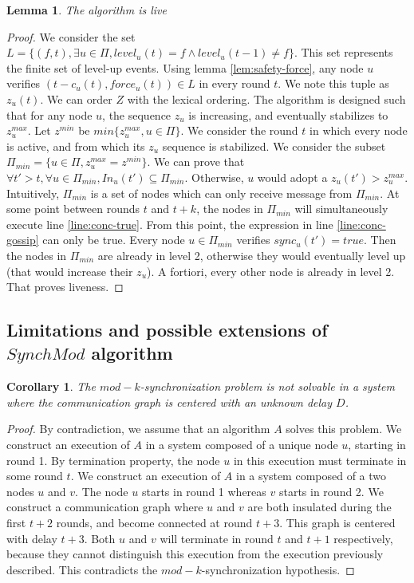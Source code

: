 \documentclass[11pt,letterpaper]{article}
\newtheorem{lem}[thm]{Lemma}
\newtheorem{cor}[thm]{Corollary}
\begin{document}
\begin{lem}
	The algorithm is live
\end{lem}
\begin{proof}
	We consider the set $L = \{(f,t), \exists u \in \Pi, level_u(t) = f \wedge level_u(t-1) \neq f\}$.
	This set represents the finite set of level-up events.
	Using lemma \ref{lem:safety-force}, any node $u$ verifies $(t-c_u(t), force_u(t)) \in L$ in every round $t$.
	We note this tuple as $z_u(t)$.
	We can order $Z$ with the lexical ordering.
	The algorithm is designed such that for any node $u$, the sequence $z_u$ is increasing, and eventually stabilizes to $z_u^{max}$.
	Let $z^{min}$ be $min \{z_u^{max}, u \in \Pi\}$.
	We consider the round $t$ in which every node is active, and from which its $z_u$ sequence is stabilized.
	We consider the subset $\Pi_{min} = \{u \in \Pi, z_u^{max} = z^{min}\}$.
	We can prove that $\forall t' > t, \forall u \in \Pi_{min}, In_u(t') \subseteq \Pi_{min}$.
	Otherwise, $u$ would adopt a $z_u(t') > z_u^{max}$.
	Intuitively, $\Pi_{min}$ is a set of nodes which can only receive message from $\Pi_{min}$.
	At some point between rounds $t$ and $t+k$, the nodes in $\Pi_{min}$ will simultaneously execute line \ref{line:conc-true}.
	From this point, the expression in line \ref{line:conc-gossip} can only be true.
	Every node $u \in \Pi_{min}$ verifies $sync_u(t') = true$.
	Then the nodes in $\Pi_{min}$ are already in level 2, otherwise they would eventually level up (that would increase their $z_u$).
	A fortiori, every other node is already in level 2.
	That proves liveness.
\end{proof}

\subsection{Limitations and possible extensions of $SynchMod$ algorithm}

\begin{cor}
	The $mod-k$-synchronization problem is not solvable in a system where the communication graph is centered with an unknown delay $D$.
\end{cor}
\begin{proof}
	By contradiction, we assume that an algorithm $A$ solves this problem.
	We construct an execution of $A$ in a system composed of a unique node $u$, starting in round 1.
	By termination property, the node $u$ in this execution must terminate in some round $t$.
	We construct an execution of $A$ in a system composed of a two nodes $u$ and $v$. The node $u$ starts in round 1 whereas $v$ starts in round 2.
	We construct a communication graph where $u$ and $v$ are both insulated during the first $t+2$ rounds, and become connected at round $t+3$.
	This graph is centered with delay $t+3$.
	Both $u$ and $v$ will terminate in round $t$ and $t+1$ respectively, because they cannot distinguish this execution from the execution previously described.
	This contradicts the $mod-k$-synchronization hypothesis.
\end{proof}
\end{document}
